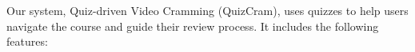 \documentclass{sigchi}
\begin{document}

Our system, Quiz-driven Video Cramming (QuizCram), uses quizzes to help users navigate the course and guide their review process. It includes the following features:
\end{document}
